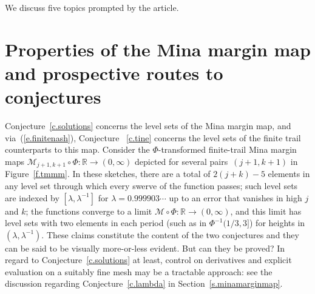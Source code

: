 \documentclass[letterpaper,11pt,oneside,reqno]{amsbook}
\newcommand{\R}{\ensuremath{\mathbb{R}}}
\numberwithin{figure}{chapter}
\theoremstyle{definition}
\theoremstyle{definition}
\theoremstyle{definition}
\theoremstyle{definition}
\theoremstyle{definition}
\newcommand{\mc}{\mathcal}
\newcommand{\minamm}{\mathcal{M}}
\newcommand{\PhiMac}{\Phi}
\begin{document}
We discuss five topics prompted by the article.

\section{Properties of the Mina margin map and prospective routes to conjectures}\label{s.conjectureroute}

Conjecture~\ref{c.solutions} concerns the level sets of the Mina margin map, and via~(\ref{e.finitenash}), 
Conjecture ~\ref{c.tine} concerns the level sets of the finite trail counterparts to this map. Consider the $\PhiMac$-transformed finite-trail Mina margin maps $\minamm_{j+1,k+1} \circ \PhiMac: \R \to (0,\infty)$
depicted for several pairs~$(j+1,k+1)$ in Figure~\ref{f.tmmm}. In these sketches, there are a total of $2(j+k) - 5$ elements in any level set through which every swerve of the function passes; 
such level sets are indexed by $[\lambda,\lambda^{-1}]$ for $\lambda =0.999903 \cdots$ up to an error that vanishes in high $j$ and $k$; the functions converge to a limit $\minamm \circ \PhiMac: \R \to (0,\infty)$, and this limit has level sets with two elements in each period (such as in $\PhiMac^{-1}(1/3,3]$) for heights in $(\lambda,\lambda^{-1})$. These claims constitute the content of the two conjectures and they can be said to be visually more-or-less evident. But can they be proved? 
In regard to Conjecture~\ref{c.solutions} at least, control on derivatives and explicit evaluation on a suitably fine mesh may be a tractable approach: see the discussion regarding Conjecture~\ref{c.lambda} in Section~\ref{s.minamarginmap}.

\end{document}
